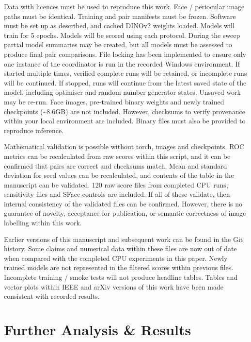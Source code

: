Data with licences must be used to reproduce this work. Face / periocular image paths must be identical. Training and pair manifests must be frozen. Software must be set up as described, and cached DINOv2 weights loaded. Models will train for 5 epochs. Models will be scored using each protocol. During the sweep partial model summaries may be created, but all models must be assessed to produce final pair comparisons. File locking has been implemented to ensure only one instance of the coordinator is run in the recorded Windows environment. If started multiple times, verified complete runs will be retained, or incomplete runs will be continued. If stopped, runs will continue from the latest saved state of the model, including optimiser and random number generator states. Unsaved work may be re-run. Face images, pre-trained binary weights and newly trained checkpoints (\textasciitilde{}8.6GB) are not included. However, checksums to verify provenance within your local environment are included. Binary files must also be provided to reproduce inference.\par

Mathematical validation is possible without torch, images and checkpoints. ROC metrics can be recalculated from raw scores within this script, and it can be confirmed that pairs are correct and checksums match. Mean and standard deviation for seed values can be recalculated, and contents of the table in the manuscript can be validated. 120 raw score files from completed CPU runs, sensitivity files and SFace controls are included. If all of these validate, then internal consistency of the validated files can be confirmed. However, there is no guarantee of novelty, acceptance for publication, or semantic correctness of image labelling within this work.\par

Earlier versions of this manuscript and subsequent work can be found in the Git history. Some claims and numerical data within these files are now out of date when compared with the completed CPU experiments in this paper. Newly trained models are not represented in the filtered scores within previous files. Incomplete training / smoke tests will not produce headline tables. Tables and vector plots within IEEE and arXiv versions of this work have been made consistent with recorded results.\par

\section{Further Analysis \& Results}


